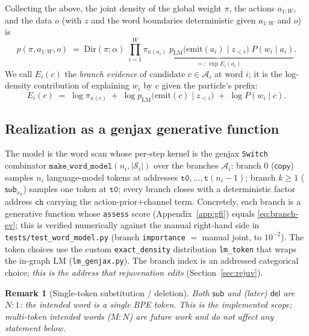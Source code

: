 \documentclass[11pt]{article}
\newcommand{\copyact}{\textsf{copy}}
\newcommand{\subact}{\textsf{sub}}
\newcommand{\delact}{\textsf{del}}
\newcommand{\given}{\mid}
\newcommand{\pLM}{p_{\mathrm{LM}}}
\newcommand{\Dir}{\mathrm{Dir}}
\newcommand{\code}[1]{\texttt{#1}}
\newtheorem{remark}{Remark}
\begin{document}
Collecting the above, the joint density of the global weight $\pi$, the actions $a_{1:W}$, and the
data $o$ (with $z$ and the word boundaries deterministic given $a_{1:W}$ and $o$) is
\begin{equation}\label{eq:joint}
  p(\pi, a_{1:W}, o)
  \;=\; \Dir(\pi; \alpha)\;
  \prod_{i=1}^{W}
  \underbrace{\pi_{\kappa(a_i)}\;
  \pLM\!\big(\mathrm{emit}(a_i)\given z_{<i}\big)\;
  P(w_i \given a_i)}_{\textstyle =:\,\exp E_i(a_i)} .
\end{equation}
We call $E_i(c)$ the \emph{branch evidence} of candidate $c \in \mathcal{A}_i$ at word $i$; it is the
log-density contribution of explaining $w_i$ by $c$ given the particle's prefix:
\begin{equation}\label{eq:branch-ev}
  E_i(c) \;=\; \log \pi_{\kappa(c)}
  \;+\; \log \pLM\!\big(\mathrm{emit}(c)\given z_{<i}\big)
  \;+\; \log P(w_i \given c).
\end{equation}

\subsection{Realization as a genjax generative function}
\label{sec:genfn}

The model is the word scan whose per-step kernel is the genjax \code{Switch} combinator
$\code{make\_word\_model}(n_i, |\mathcal{S}_i|)$ over the branches $\mathcal{A}_i$:
branch $0$ ($\copyact$) samples $n_i$ language-model tokens at addresses
$\code{t0},\dots,\code{t}(n_i{-}1)$; branch $k\ge 1$ ($\subact_{x_k}$) samples one token at
$\code{t0}$; every branch closes with a deterministic factor address $\code{ch}$ carrying the
action-prior$+$channel term. Concretely, each branch is a generative function whose \code{assess}
score (Appendix~\ref{app:gfi}) equals \eqref{eq:branch-ev}; this is verified numerically against the
manual right-hand side in \code{tests/test\_word\_model.py} (branch \code{importance}
$=$ manual joint, to $10^{-2}$). The token choices use the custom \code{exact\_density} distribution
\code{lm\_token} that wraps the in-graph LM (\code{lm\_genjax.py}). The branch index is an
addressed categorical choice; \emph{this is the address that rejuvenation edits}
(Section~\ref{sec:rejuv}).

\begin{remark}[Single-token substitution / deletion]
Both $\subact$ and (later) $\delact$ are $N{:}1$: the intended word is a single BPE token. This is
the implemented scope; multi-token intended words ($M{:}N$) are future work and do not affect any
statement below.
\end{remark}
\end{document}
